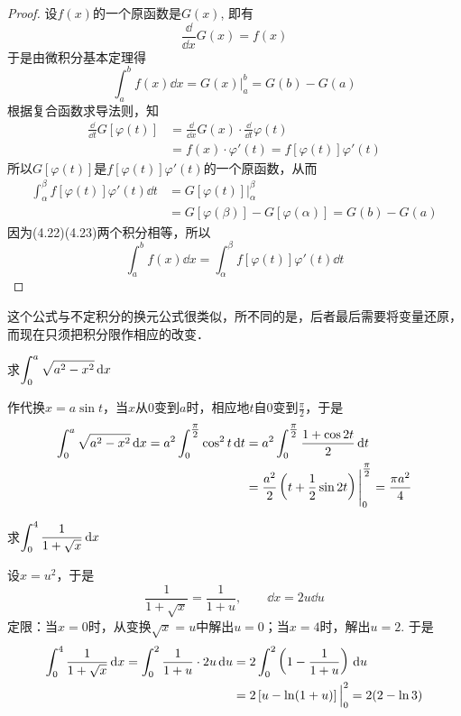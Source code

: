 \begin{proof}
    设$f(x)$的一个原函数是$G(x)$, 即有
\[\frac{\dd}{\dd x}G (x) =f (x)\]
于是由微积分基本定理得
\begin{equation}
    \int^b_a f (x)\dd x=G(x)\Big|^b_a=G(b) -G (a)
\end{equation}
根据复合函数求导法则，知
\[\begin{split}
    \frac{\dd}{ \dd t}G[\varphi  (t) ] &=\frac{\dd}{ \dd x}G (x)\cdot  \frac{\dd}{ \dd t}\varphi  (t)\\
    &=f(x)\cdot \varphi'(t)=f[\varphi(t)]\varphi'(t)
\end{split}\]
所以$G[\varphi (t)]$是$f[\varphi (t)]\varphi '(t)$的一个原函数，从而
\begin{equation}
    \begin{split}
\int^{\beta}_{\alpha} f [\varphi  (t) ] \varphi ' (t) \dd t&=G [\varphi  (t) ]\Big|^{\beta}_{\alpha}\\
&=       G [\varphi  (\beta) ] -G [\varphi  (\alpha) ]=G (b) -G (a)
    \end{split}
\end{equation}
因为(4.22)(4.23)两个积分相等，所以
\[\int^b_a f(x) \dd x= \int^{\beta}_{\alpha} f [\varphi  (t) ] \varphi ' (t) \dd t\]
\end{proof}

这个公式与不定积分的换元公式很类似，所不同的是，后者最后需要将变量还原，而现在只须把积分限作相应的改变．

\begin{example}
    求$\displaystyle\int^a_0 \sqrt{a^2-x^2}\,{\rm d} x$
\end{example}

\begin{solution}
作代换$x=a\sin t$，当$x$从0变到$a$时，相应地$t$自0变到$\frac{\pi}{2}$，于是
\[\begin{split}
    \displaystyle\int^a_0 \sqrt{a^2-x^2}\,{\rm d} x=a^2\int^{\tfrac{\pi}{2}}_0 \cos ^2 t\,{\rm d} t&=a^2\int^{\tfrac{\pi}{2}}_0 \dfrac{1+\cos 2t}{2}\,{\rm d} t\\
    &=\dfrac{a^2}{2}\left(t+\dfrac{1}{2}\sin 2t\right)\Bigg|^{\tfrac{\pi}{2}}_0=\dfrac{\pi a^2}{4} 
\end{split}\]
\end{solution}

\begin{example}
    求$\displaystyle\int^4_0 \dfrac{1}{1+\sqrt{x}}\,{\rm d} x$
\end{example}

\begin{solution}
    设$x=u^2$，于是
\[\frac{1}{1+\sqrt{x}}=\frac{1}{1+u},\qquad \dd x=2u\dd u\]
定限：当$x=0$时，从变换$\sqrt{x}=u$中解出$u=0$；当$x=4$时，解出$u=2$. 于是
\[\begin{split}
    \displaystyle\int^4_0 \dfrac{1}{1+\sqrt{x}}\,{\rm d} x=\int^2_0 \dfrac{1}{1+u}\cdot 2u\,{\rm d} u&=2\int^2_0 \left(1-\dfrac{1}{1+u}\right)\,{\rm d} u\\
    &=2\left[u-\ln(1+u)\right]\Big|^2_0=2(2-\ln 3)
\end{split}\]
\end{solution}

